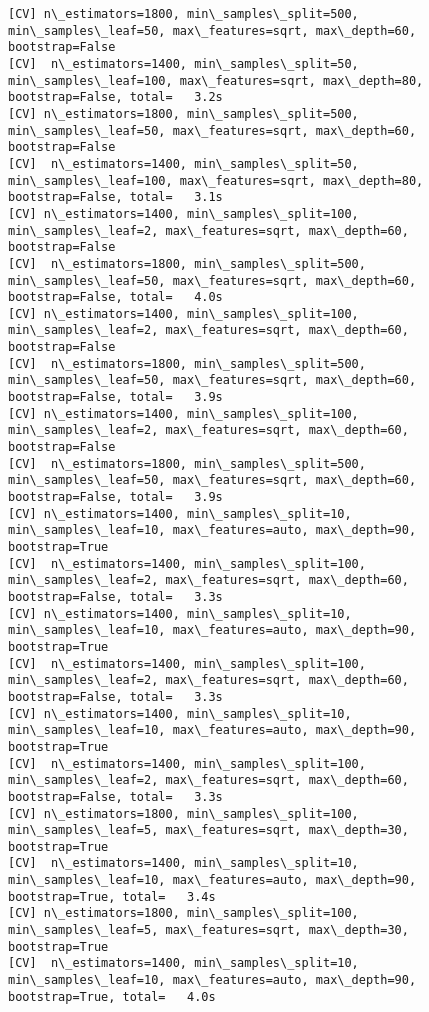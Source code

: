 \documentclass[11pt]{article}
\begin{document}
\begin{Verbatim}[commandchars=\\\{\}]
[CV] n\_estimators=1800, min\_samples\_split=500, min\_samples\_leaf=50, max\_features=sqrt, max\_depth=60, bootstrap=False 
[CV]  n\_estimators=1400, min\_samples\_split=50, min\_samples\_leaf=100, max\_features=sqrt, max\_depth=80, bootstrap=False, total=   3.2s
[CV] n\_estimators=1800, min\_samples\_split=500, min\_samples\_leaf=50, max\_features=sqrt, max\_depth=60, bootstrap=False 
[CV]  n\_estimators=1400, min\_samples\_split=50, min\_samples\_leaf=100, max\_features=sqrt, max\_depth=80, bootstrap=False, total=   3.1s
[CV] n\_estimators=1400, min\_samples\_split=100, min\_samples\_leaf=2, max\_features=sqrt, max\_depth=60, bootstrap=False 
[CV]  n\_estimators=1800, min\_samples\_split=500, min\_samples\_leaf=50, max\_features=sqrt, max\_depth=60, bootstrap=False, total=   4.0s
[CV] n\_estimators=1400, min\_samples\_split=100, min\_samples\_leaf=2, max\_features=sqrt, max\_depth=60, bootstrap=False 
[CV]  n\_estimators=1800, min\_samples\_split=500, min\_samples\_leaf=50, max\_features=sqrt, max\_depth=60, bootstrap=False, total=   3.9s
[CV] n\_estimators=1400, min\_samples\_split=100, min\_samples\_leaf=2, max\_features=sqrt, max\_depth=60, bootstrap=False 
[CV]  n\_estimators=1800, min\_samples\_split=500, min\_samples\_leaf=50, max\_features=sqrt, max\_depth=60, bootstrap=False, total=   3.9s
[CV] n\_estimators=1400, min\_samples\_split=10, min\_samples\_leaf=10, max\_features=auto, max\_depth=90, bootstrap=True 
[CV]  n\_estimators=1400, min\_samples\_split=100, min\_samples\_leaf=2, max\_features=sqrt, max\_depth=60, bootstrap=False, total=   3.3s
[CV] n\_estimators=1400, min\_samples\_split=10, min\_samples\_leaf=10, max\_features=auto, max\_depth=90, bootstrap=True 
[CV]  n\_estimators=1400, min\_samples\_split=100, min\_samples\_leaf=2, max\_features=sqrt, max\_depth=60, bootstrap=False, total=   3.3s
[CV] n\_estimators=1400, min\_samples\_split=10, min\_samples\_leaf=10, max\_features=auto, max\_depth=90, bootstrap=True 
[CV]  n\_estimators=1400, min\_samples\_split=100, min\_samples\_leaf=2, max\_features=sqrt, max\_depth=60, bootstrap=False, total=   3.3s
[CV] n\_estimators=1800, min\_samples\_split=100, min\_samples\_leaf=5, max\_features=sqrt, max\_depth=30, bootstrap=True 
[CV]  n\_estimators=1400, min\_samples\_split=10, min\_samples\_leaf=10, max\_features=auto, max\_depth=90, bootstrap=True, total=   3.4s
[CV] n\_estimators=1800, min\_samples\_split=100, min\_samples\_leaf=5, max\_features=sqrt, max\_depth=30, bootstrap=True 
[CV]  n\_estimators=1400, min\_samples\_split=10, min\_samples\_leaf=10, max\_features=auto, max\_depth=90, bootstrap=True, total=   4.0s

\end{Verbatim}
\end{document}
